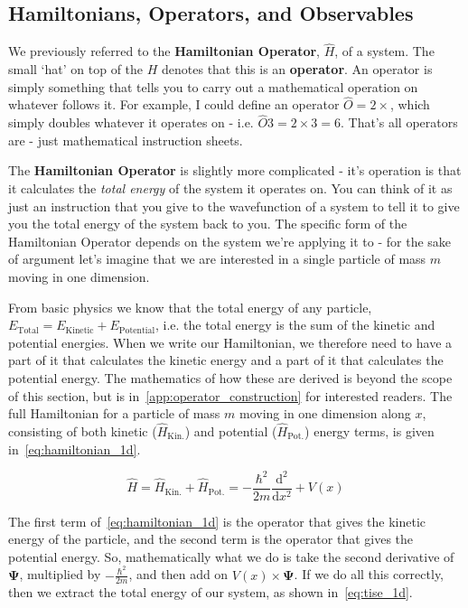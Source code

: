 \documentclass{memoir}[11pt,oneside,a4paper,openany]
\newcommand{\wf}{\ensuremath{\bm{\Psi}}\xspace}
\begin{document}
\subsection{Hamiltonians, Operators, and Observables}
We previously referred to the \textbf{Hamiltonian Operator}, $\hat{H}$, of a system. The small `hat' on top of the $H$ denotes that this is an \textbf{operator}. An operator is simply something that tells you to carry out a mathematical operation on whatever follows it. For example, I could define an operator $\hat{O} = 2\times$, which simply doubles whatever it operates on - i.e. $\hat{O}3 = 2\times 3 = 6$. That's all operators are - just mathematical instruction sheets. 

The \textbf{Hamiltonian Operator} is slightly more complicated - it's operation is that it calculates the \emph{total energy} of the system it operates on. You can think of it as just an instruction that you give to the wavefunction of a system to tell it to give you the total energy of the system back to you. The specific form of the Hamiltonian Operator depends on the system we're applying it to - for the sake of argument let's imagine that we are interested in a single particle of mass $m$ moving in one dimension. 

From basic physics we know that the total energy of any particle, $E_{\text{Total}} = E_{\text{Kinetic}} + E_{\text{Potential}}$, i.e. the total energy is the sum of the kinetic and potential energies. When we write our Hamiltonian, we therefore need to have a part of it that calculates the kinetic energy and a part of it that calculates the potential energy. The mathematics of how these are derived is beyond the scope of this section, but is in~\autoref{app:operator_construction} for interested readers. The full Hamiltonian for a particle of mass $m$ moving in one dimension along $x$, consisting of both kinetic ($\hat{H}_{\text{Kin.}}$) and potential ($\hat{H}_{\text{Pot.}}$) energy terms, is given in~\autoref{eq:hamiltonian_1d}. 

\begin{equation}\label{eq:hamiltonian_1d}
	\hat{H} = \hat{H}_{\text{Kin.}} + \hat{H}_{\text{Pot.}} = -\frac{\hbar^2}{2m} \frac{\mathrm{d}^2}{\mathrm{d}x^2} + V(x)
\end{equation}

The first term of~\autoref{eq:hamiltonian_1d} is the operator that gives the kinetic energy of the particle, and the second term is the operator that gives the potential energy. So, mathematically what we do is take the second derivative of \wf, multiplied by $-\frac{\hbar^2}{2m}$, and then add on $V(x) \times \wf$. If we do all this correctly, then we extract the total energy of our system, as shown in~\autoref{eq:tise_1d}.
\end{document}
